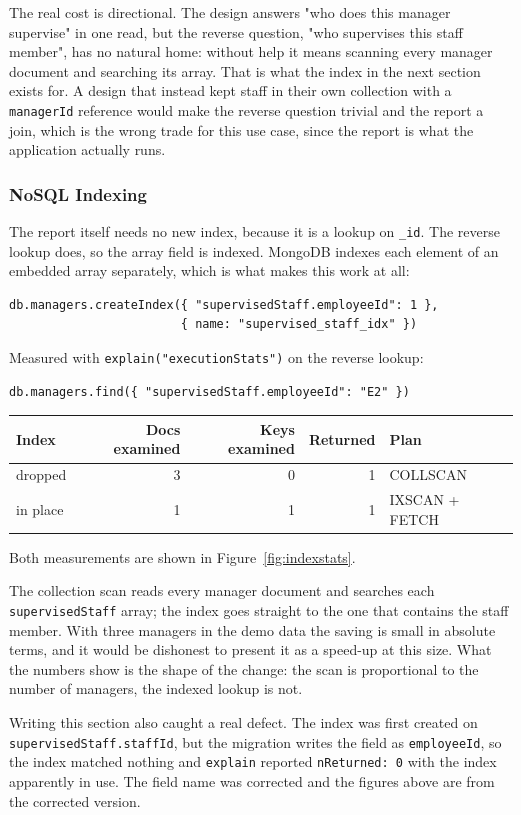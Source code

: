 \documentclass[a4paper, 11pt]{article}          %
\begin{document}
The real cost is directional. The design answers "who does this manager
supervise" in one read, but the reverse question, "who supervises this staff
member", has no natural home: without help it means scanning every manager
document and searching its array. That is what the index in the next section
exists for. A design that instead kept staff in their own collection with a
\texttt{managerId} reference would make the reverse question trivial and the
report a join, which is the wrong trade for this use case, since the report is
what the application actually runs.

\subsubsection{NoSQL Indexing}

The report itself needs no new index, because it is a lookup on \texttt{\_id}.
The reverse lookup does, so the array field is indexed. MongoDB indexes each
element of an embedded array separately, which is what makes this work at all:

\begin{lstlisting}
db.managers.createIndex({ "supervisedStaff.employeeId": 1 },
                        { name: "supervised_staff_idx" })
\end{lstlisting}

Measured with \texttt{explain("executionStats")} on the reverse lookup:

\begin{lstlisting}
db.managers.find({ "supervisedStaff.employeeId": "E2" })
\end{lstlisting}

\begin{center}
\begin{tabular}{lrrrl}
\toprule
Index & Docs examined & Keys examined & Returned & Plan \\
\midrule
dropped  & 3 & 0 & 1 & COLLSCAN \\
in place & 1 & 1 & 1 & IXSCAN + FETCH \\
\bottomrule
\end{tabular}
\end{center}

Both measurements are shown in Figure~\ref{fig:indexstats}.

The collection scan reads every manager document and searches each
\texttt{supervisedStaff} array; the index goes straight to the one that contains
the staff member. With three managers in the demo data the saving is small in
absolute terms, and it would be dishonest to present it as a speed-up at this
size. What the numbers show is the shape of the change: the scan is proportional
to the number of managers, the indexed lookup is not.

Writing this section also caught a real defect. The index was first created on
\texttt{supervisedStaff.staffId}, but the migration writes the field as
\texttt{employeeId}, so the index matched nothing and
\texttt{explain} reported \texttt{nReturned: 0} with the index apparently in
use. The field name was corrected and the figures above are from the corrected
version.
\end{document}
